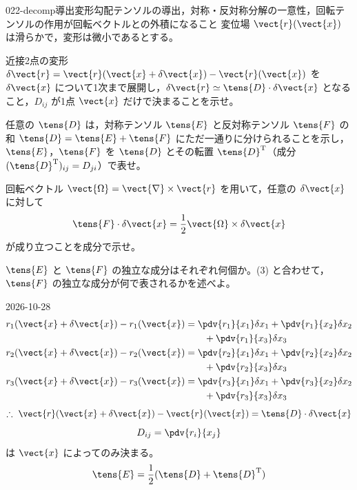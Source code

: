 \documentclass[uplatex,dvipdfmx,a4paper,11pt]{jsarticle}
\begin{document}
\begin{mondai}{022-decomp}{導出}{変形勾配テンソルの導出，対称・反対称分解の一意性，回転テンソルの作用が回転ベクトルとの外積になること}
変位場 $\vect{r}(\vect{x})$ は滑らかで，変形は微小であるとする。
  \begin{shoumon}
    \item 近接2点の変形 $\delta\vect{r}=\vect{r}(\vect{x}+\delta\vect{x})-\vect{r}(\vect{x})$ を $\delta\vect{x}$ について1次まで展開し，$\delta\vect{r}\simeq\tens{D}\cdot\delta\vect{x}$ となること，$D_{ij}$ が1点 $\vect{x}$ だけで決まることを示せ。
    \item 任意の $\tens{D}$ は，対称テンソル $\tens{E}$ と反対称テンソル $\tens{F}$ の和 $\tens{D}=\tens{E}+\tens{F}$ にただ一通りに分けられることを示し，$\tens{E}$，$\tens{F}$ を $\tens{D}$ とその転置 $\tens{D}^{\mathrm{T}}$（成分 $(\tens{D}^{\mathrm{T}})_{ij}=D_{ji}$）で表せ。
    \item 回転ベクトル $\vect{\Omega}=\vect{\nabla}\times\vect{r}$ を用いて，任意の $\delta\vect{x}$ に対して
    \[ \tens{F}\cdot\delta\vect{x}=\frac{1}{2}\vect{\Omega}\times\delta\vect{x} \]
    が成り立つことを成分で示せ。
    \item $\tens{E}$ と $\tens{F}$ の独立な成分はそれぞれ何個か。(3) と合わせて，$\tens{F}$ の独立な成分が何で表されるかを述べよ。
  \end{shoumon}
\begin{kotaeutsushi}{2026-10-28}
\begin{align*}
r_{1}(\vect{x}+\delta\vect{x})-r_{1}(\vect{x})&=\pdv{r_{1}}{x_{1}}\delta x_{1}+\pdv{r_{1}}{x_{2}}\delta x_{2}\\
&\qquad+\pdv{r_{1}}{x_{3}}\delta x_{3}\\
r_{2}(\vect{x}+\delta\vect{x})-r_{2}(\vect{x})&=\pdv{r_{2}}{x_{1}}\delta x_{1}+\pdv{r_{2}}{x_{2}}\delta x_{2}\\
&\qquad+\pdv{r_{2}}{x_{3}}\delta x_{3}\\
r_{3}(\vect{x}+\delta\vect{x})-r_{3}(\vect{x})&=\pdv{r_{3}}{x_{1}}\delta x_{1}+\pdv{r_{3}}{x_{2}}\delta x_{2}\\
&\qquad+\pdv{r_{3}}{x_{3}}\delta x_{3}
\end{align*}
\[ \therefore\ \vect{r}(\vect{x}+\delta\vect{x})-\vect{r}(\vect{x})=\tens{D}\cdot\delta\vect{x} \]
\[ D_{ij}=\pdv{r_{i}}{x_{j}} \]
 は $\vect{x}$ によってのみ決まる。
\[ \tens{E}=\frac{1}{2}(\tens{D}+\tens{D}^{\mathrm{T}}) \]

\end{kotaeutsushi}
\end{mondai}
\end{document}
